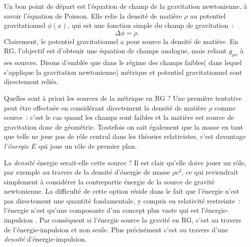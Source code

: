 Un bon point de départ est l'équation de champ de la gravitation newtonienne, à savoir l'équation de Poisson. Elle relie la densité de matière $\rho$ au potentiel gravitationnel $\phi(x)$, qui est une fonction simple du champ de gravitation~:
\begin{equation}
\Delta \phi =\rho.
\label{e:poisson}
\end{equation}
Clairement, le potentiel gravitationnel a pour source la densité de matière. En RG, l'objectif est d'obtenir une équation de champs analogue, mais reliant $g_{\mu\nu}$ à ses sources. Disons d'emblée que dans le régime des champs faibles( dans lequel s’applique la gravitation newtonienne) métrique et potentiel gravitationnel sont directement reliés.

Quelles sont à priori les sources de la métrique en RG ? Une première tentative peut être effectuée en considérant directement la densité de matière $\rho$ comme source~: c'est le cas quand les champs sont faibles et la matière est source de gravitation donc de géométrie. Toutefois on sait également que la masse en tant que telle ne joue pas de rôle central dans les théories relativistes, c'est davantage \textit{l'énergie} $E$ qui joue un rôle de premier plan. 

La \textit{densité} énergie serait-elle cette source ? Il est clair qu'elle doive jouer un rôle, par exemple au travers de la densité d'énergie de masse $\rho c^2$, ce qui reviendrait simplement à considérer la contrepartie énergie de la source de gravité newtonienne. La difficulté de cette option réside dans le fait que l'énergie n'est pas directement une quantité fondamentale, y compris en relativité restreinte~: l'énergie n'est qu'une composante d'un concept plus vaste qui est l'énergie-impulsion . Par conséquent si l'énergie source la gravité en RG, c'est au travers de l'énergie-impulsion et non seule. Plus précisément c'est au travers d'une \textit{densité} d'énergie-impulsion.

